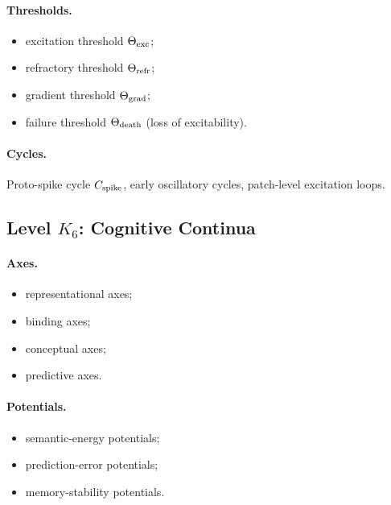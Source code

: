 \paragraph{Thresholds.}
\begin{itemize}
    \item excitation threshold \(\Theta_{\rm exc}\);
    \item refractory threshold \(\Theta_{\rm refr}\);
    \item gradient threshold \(\Theta_{\rm grad}\);
    \item failure threshold \(\Theta_{\rm death}\) (loss of excitability).
\end{itemize}

\paragraph{Cycles.}
Proto-spike cycle \(C_{\rm spike}\),
early oscillatory cycles,
patch-level excitation loops.


\subsection{Level \texorpdfstring{\texorpdfstring{$K_6$}{K\_6}}{K6}: Cognitive Continua}

\paragraph{Axes.}
\begin{itemize}
    \item representational axes;
    \item binding axes;
    \item conceptual axes;
    \item predictive axes.
\end{itemize}

\paragraph{Potentials.}
\begin{itemize}
    \item semantic-energy potentials;
    \item prediction-error potentials;
    \item memory-stability potentials.
\end{itemize}

